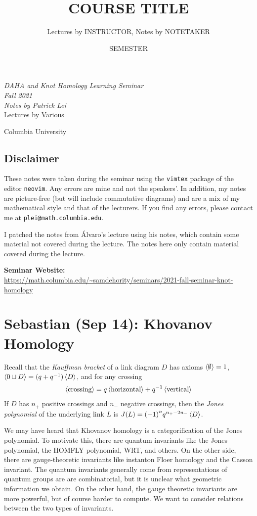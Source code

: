 \documentclass[leqno, openany]{memoir}
\title{COURSE TITLE}
\author{Lectures by INSTRUCTOR, Notes by NOTETAKER}
\date{SEMESTER}
\theoremstyle{definition}
\theoremstyle{remark}
\theoremstyle{plain}
\theoremstyle{definition}
\theoremstyle{remark}
\newcommand*{\titleSW}
    {\begingroup%
    \raggedleft
    \vspace*{\baselineskip}
    {\Huge\itshape DAHA and Knot Homology Learning Seminar \\ Fall 2021}\\[\baselineskip]
    {\large\itshape Notes by Patrick Lei}\\[0.2\textheight]
    {\Large Lectures by Various}\par
    \vfill
    {\Large \sffamily Columbia University}
    \vspace*{\baselineskip}
\endgroup}
\begin{document}
    
\begin{titlingpage}
\titleSW
\end{titlingpage}

\thispagestyle{empty}
\section*{Disclaimer}%
\label{sec:disclaimer}

These notes were taken during the seminar using the \texttt{vimtex} package of
the editor \texttt{neovim}.  Any errors are mine and not the speakers'.  In
addition, my notes are picture-free (but will include commutative diagrams) and
are a mix of my mathematical style and that of the lecturers.  If you find any
errors, please contact me at \texttt{plei@math.columbia.edu}.

I patched the notes from \'Alvaro's lecture using his notes, which contain some
material not covered during the lecture. The notes here only contain material
covered during the lecture.

\vspace*{1cm}

\noindent\textbf{Seminar Website:}\\
\url{https://math.columbia.edu/~samdehority/seminars/2021-fall-seminar-knot-homology} \newpage

\tableofcontents

\chapter{Sebastian (Sep 14): Khovanov Homology}%
\label{cha:sebastian_sep_14_khovanov_homology}

Recall that the \textit{Kauffman bracket} of a link diagram $D$ has axioms $\ev{\emptyset} = 1$, $\ev{0 \sqcup D} = (q+q^{-1}) \ev{D}$, and for any crossing
\[ \ev{\text{crossing}} = q \ev{\text{horizontal}} + q^{-1} \ev{\text{vertical}} \]
If $D$ has $n_+$ positive crossings and $n_-$ negative crossings, then the \textit{Jones polynomial} of the underlying link $L$ is $J(L) = {(-1)}^n q^{n_+ - 2n_-} \ev{D}$.

We may have heard that Khovanov homology is a categorification of the Jones polynomial. To motivate this, there are quantum invariants like the Jones polynomial, the HOMFLY polynomial, WRT, and others. On the other side, there are gauge-theoretic invariants like instanton Floer homology and the Casson invariant. The quantum invariants generally come from representations of quantum groups are are combinatorial, but it is unclear what geometric information we obtain. On the other hand, the gauge theoretic invariants are more powerful, but of course harder to compute. We want to consider relations between the two types of invariants.
\end{document}
